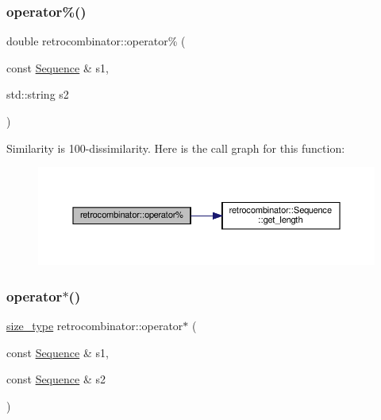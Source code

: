 \subsubsection{\texorpdfstring{operator\%()}{operator\%()}\hspace{0.1cm}{\footnotesize\ttfamily [2/2]}}
{\footnotesize\ttfamily double retrocombinator\+::operator\% (\begin{DoxyParamCaption}\item[{const \hyperlink{classretrocombinator_1_1Sequence}{Sequence} \&}]{s1,  }\item[{std\+::string}]{s2 }\end{DoxyParamCaption})}

Similarity is 100-\/dissimilarity. Here is the call graph for this function\+:
\nopagebreak
\begin{figure}[H]
\begin{center}
\leavevmode
\includegraphics[width=350pt]{namespaceretrocombinator_a540b38522d54f6df8c0b7d9541b287c7_cgraph}
\end{center}
\end{figure}
\mbox{\label{namespaceretrocombinator_a2d223ac406c9e02cf5687c709ad5da9d}} 
\subsubsection{\texorpdfstring{operator$\ast$()}{operator*()}\hspace{0.1cm}{\footnotesize\ttfamily [1/2]}}
{\footnotesize\ttfamily \hyperlink{namespaceretrocombinator_a8e1541b50cee66a791df4c437ccbb385}{size\+\_\+type} retrocombinator\+::operator$\ast$ (\begin{DoxyParamCaption}\item[{const \hyperlink{classretrocombinator_1_1Sequence}{Sequence} \&}]{s1,  }\item[{const \hyperlink{classretrocombinator_1_1Sequence}{Sequence} \&}]{s2 }\end{DoxyParamCaption})}

